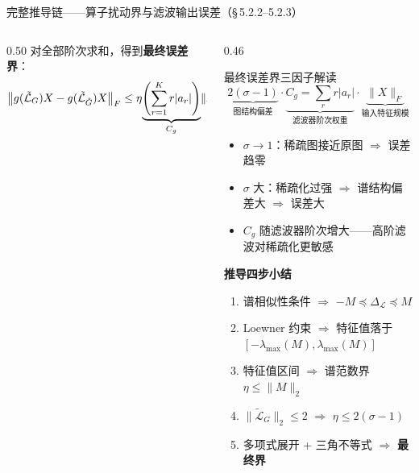 \documentclass[aspectratio=169,9pt,xcolor=dvipsnames]{beamer}
\newcommand{\highlight}[1]{\textcolor{myred}{\textbf{#1}}}
\begin{document}
\begin{frame}{完整推导链——算子扰动界与滤波输出误差（§\,5.2.2--5.2.3）}
\begin{columns}[T]
\begin{column}{0.50\textwidth}
{  对全部阶次求和，得到\textbf{最终误差界}：
  \begin{equation*}
    \bigl\|g(\tilde{\mathcal{L}}_G)X-g(\tilde{\mathcal{L}}_{\hat{G}})X\bigr\|_F
    \le\eta\!\underbrace{\left(\sum_{r=1}^{K}r|a_r|\right)}_{C_g}\!\|X\|_F
    \le{\color{myred}2(\sigma-1)\,C_g\,\|X\|_F}
  \end{equation*}
  }
\end{column}

\begin{column}{0.46\textwidth}
  \begin{block}{最终误差界三因子解读}
    \begin{equation*}
      \underbrace{2(\sigma-1)}_{\text{图结构偏差}}
      \cdot
      \underbrace{C_g=\sum_{r}r|a_r|}_{\text{滤波器阶次权重}}
      \cdot
      \underbrace{\|X\|_F}_{\text{输入特征规模}}
    \end{equation*}
    \begin{itemize}\setlength{\itemsep}{3pt}
      \item $\sigma\to 1$：稀疏图接近原图 $\Rightarrow$ 误差趋零
      \item $\sigma$ 大：稀疏化过强 $\Rightarrow$ 谱结构偏差大 $\Rightarrow$ 误差大
      \item $C_g$ 随滤波器阶次增大——高阶滤波对稀疏化更敏感
    \end{itemize}
  \end{block}

  \textbf{推导四步小结}
  \begin{enumerate}\small\setlength{\itemsep}{4pt}
    \item 谱相似性条件 $\Rightarrow$ $-M\preceq\Delta_{\mathcal{L}}\preceq M$
    \item Loewner 约束 $\Rightarrow$ 特征值落于 $[-\lambda_{\max}(M),\lambda_{\max}(M)]$
    \item 特征值区间 $\Rightarrow$ 谱范数界 $\eta\le\|M\|_2$
    \item $\|\tilde{\mathcal{L}}_G\|_2\le 2$ $\Rightarrow$ \highlight{$\eta\le 2(\sigma-1)$}
    \item 多项式展开 + 三角不等式 $\Rightarrow$ \highlight{最终界}
  \end{enumerate}

\end{column}
\end{columns}
\end{frame}
\end{document}
